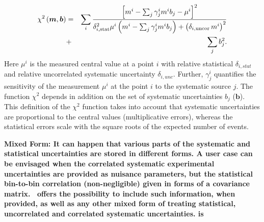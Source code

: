 \begin{description}
\begin{eqnarray} 
    \chi^2\left(\boldsymbol{m},\boldsymbol{b}\right) &= &  
 \sum_i \frac{\left[m^i - \sum_j \gamma^i_j m^i b_j  - {\mu^i} \right]^2}
{ \textstyle \delta^2_{i,{\rm stat}}\mu^i \left(m^i -  \sum_j \gamma^i_j m^i b_j\right)
  + \left(\delta_{i,{\rm uncor}}\,  m^i\right)^2} \nonumber \\
  &+& \sum_j b^2_j.
\label{eq:aven}
\end{eqnarray}
%
Here ${\mu^i}$ is the  measured central value  at a point $i$ 
with  relative statistical $\delta_{i,stat}$ 
and relative uncorrelated systematic uncertainty $\delta_{i,unc}$.
Further, 
$\gamma^i_j$ 
quantifies the sensitivity of the
measurement ${\mu^i}$ at the point $i$ to the systematic source $j$. 
The function $\chi^2$ depends in addition on
 the set of systematic uncertainties $b_j$ ($\boldsymbol{b}$).
This definition of the $\chi^2$ function takes into account that
systematic uncertainties are proportional to the central values 
(multiplicative errors), whereas the statistical errors scale 
with the square roots of the expected number of events. 
\item  \bf{Mixed Form:} \rm
It can happen that various parts of the systematic and statistical uncertainties are stored in different forms.  A user case can be envisaged when the correlated systematic experimental uncertainties are provided as nuisance parameters, but the statistical bin-to-bin correlation (non-negligible) given in forms of a covariance matrix. \fitter\ offers the possibility to include such information, when provided, as well as any other mixed form of treating statistical, uncorrelated and correlated systematic uncertainties. 
is
\end{description}



